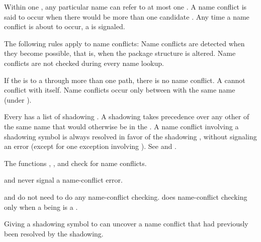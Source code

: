 \endsubsubsubsection%


Within one , any particular name can refer to at most one
.  A name conflict is said to occur when there would be more than
one candidate .  Any time a name conflict is about to occur,
a   is signaled.  

The following rules apply to name conflicts:
\beginlist
\itemitem{--}
Name conflicts are detected when they become possible, that is, when the
package structure is altered.  Name
conflicts are not checked during every name lookup.

\itemitem{--}
If the   is  to a  
through more than one path, there is no name conflict.
A  cannot conflict with itself. 
Name conflicts occur only between   with
the same name (under ).

\itemitem{--} Every  has a list of shadowing .  
A shadowing  takes precedence over any other  of
the same name that would otherwise be  in the .  
A name conflict involving a shadowing symbol is always resolved in favor of
the shadowing , without signaling an error (except for one
exception involving ).
See  and .

\itemitem{--} 
The functions , , and 
 check for name conflicts.  

\itemitem{--} 
 and  
never signal a name-conflict error.

\itemitem{--} 
 and 
do not need to do any name-conflict checking.
 does name-conflict checking only when a  
being  is a .

\itemitem{--} 
Giving a shadowing symbol to  
can uncover a name conflict that had
previously been resolved by the shadowing.  


